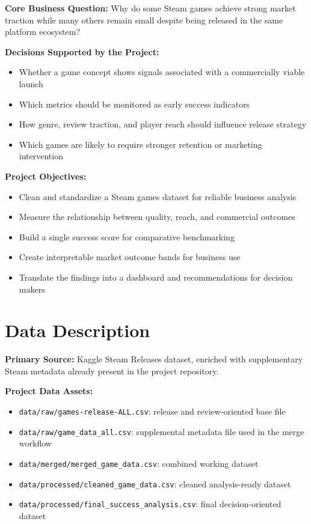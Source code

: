 \documentclass[12pt,a4paper]{report}
\begin{document}
\textbf{Core Business Question:} Why do some Steam games achieve strong market traction while many others remain small despite being released in the same platform ecosystem?

\textbf{Decisions Supported by the Project:}
\begin{itemize}
\item Whether a game concept shows signals associated with a commercially viable launch
\item Which metrics should be monitored as early success indicators
\item How genre, review traction, and player reach should influence release strategy
\item Which games are likely to require stronger retention or marketing intervention
\end{itemize}

\textbf{Project Objectives:}
\begin{itemize}
\item Clean and standardize a Steam games dataset for reliable business analysis
\item Measure the relationship between quality, reach, and commercial outcomes
\item Build a single success score for comparative benchmarking
\item Create interpretable market outcome bands for business use
\item Translate the findings into a dashboard and recommendations for decision makers
\end{itemize}

\chapter{Data Description}

\textbf{Primary Source:} Kaggle Steam Releases dataset, enriched with supplementary Steam metadata already present in the project repository.

\textbf{Project Data Assets:}
\begin{itemize}
\item \texttt{data/raw/games-release-ALL.csv}: release and review-oriented base file
\item \texttt{data/raw/game\_data\_all.csv}: supplemental metadata file used in the merge workflow
\item \texttt{data/merged/merged\_game\_data.csv}: combined working dataset
\item \texttt{data/processed/cleaned\_game\_data.csv}: cleaned analysis-ready dataset
\item \texttt{data/processed/final\_success\_analysis.csv}: final decision-oriented dataset
\end{itemize}
\end{document}
